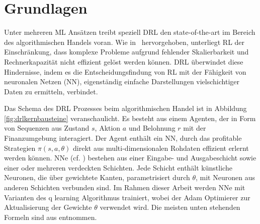 \chapter{Grundlagen}
\label{ch:grundlagen}

Unter mehreren \acs{ML} Ansätzen treibt speziell \acs{DRL} den state-of-the-art im Bereich des algorithmischen Handels voran. Wie in~\parencite{surveyDRL} hervorgehoben, unterliegt \acs{RL} der Einschränkung, dass komplexe Probleme aufgrund fehlender Skalierbarkeit und Rechnerkapazität nicht effizient gelöst werden können. \acs{DRL} überwindet diese Hindernisse, indem es die Entscheidungsfindung von \acs{RL} mit der Fähigkeit von neuronalen Netzen (\acs{NN}), eigenständig einfache Darstellungen vielschichtiger Daten zu ermitteln, verbindet.

Das Schema des \acs{DRL} Prozesses beim algorithmischen Handel ist in Abbildung \ref{fig:drlkernbausteine} veranschaulicht.
Es besteht aus einem Agenten, der in Form von Sequenzen aus Zustand $s$, Aktion $a$ und Belohnung $r$ mit der Finanzumgebung interagiert.
Der Agent enthält ein \acs{NN}, durch das profitable Strategien $\pi(s,a,\theta)$ direkt aus multi-dimensionalen Rohdaten effizient erlernt werden können.
\acs{NN}e (cf. \parencite{10.5555/1671238}) bestehen aus einer Eingabe- und Ausgabeschicht sowie einer oder mehreren verdeckten Schichten. Jede Schicht enthält künstliche Neuronen, die über gewichtete Kanten, parametrisiert durch $\theta$, mit Neuronen aus anderen Schichten verbunden sind. 
Im Rahmen dieser Arbeit werden \acs{NN}e mit Varianten des q learning Algorithmus trainiert, wobei der Adam Optimierer zur Aktualisierung der Gewichte $\theta$ verwendet wird.
Die meisten unten stehenden Formeln sind aus \parencites{antari,lample2018playing} entnommen.

